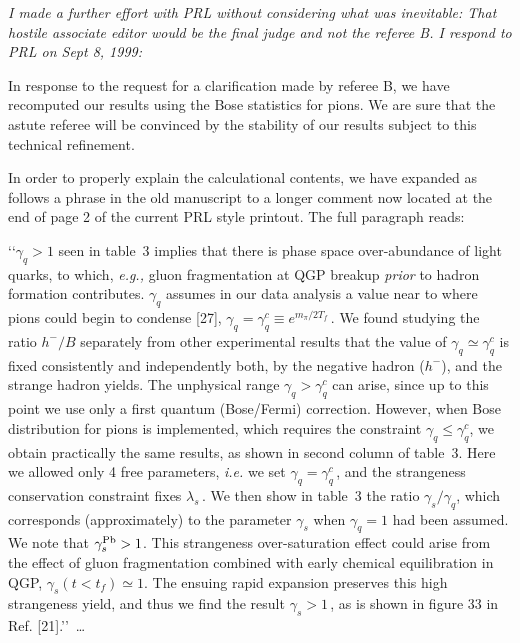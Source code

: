 \noindent \textit{I made a further effort with PRL without considering what was inevitable: That hostile  associate editor   would be the final judge and not the referee B. I respond to PRL on Sept 8, 1999:}\\[-0.7cm]
%
\begin{mdframed}[linecolor=gray,roundcorner=12pt,backgroundcolor=Dandelion!15,linewidth=1pt,leftmargin=0cm,rightmargin=0cm,topline=true,bottomline=true,skipabove=12pt]\relax%
%
In response to the request for a clarification made by referee B, we have recomputed our results using the Bose statistics for pions. We are sure that the astute referee will be convinced by the stability of our results subject to this technical refinement.

In order to properly explain the calculational contents, we have expanded as follows a phrase in the old manuscript to a longer comment now located at the end of page 2 of the current PRL style printout. The full paragraph reads:

\lq\lq $\gamma_q>1$ seen in table~3 implies that there is phase space over-abundance of light quarks, to which, {\it e.g.,} gluon fragmentation at QGP breakup {\it prior} to hadron formation contributes. $\gamma_q$ assumes in our data analysis a value near to where pions could begin to condense [27], $\gamma_q=\gamma_q^c\equiv e^{m_\pi/2T_f}$\,. We found studying the ratio $h^-/B$ separately from other experimental results that the value of $\gamma_q\simeq\gamma_q^c$ is fixed consistently and independently both, by the negative hadron ($h^-$), and the strange hadron yields. The unphysical range $\gamma_q>\gamma_q^c$ can arise, since up to this point we use only a first quantum (Bose/Fermi) correction. However, when Bose distribution for pions is implemented, which requires the constraint $\gamma_q\le\gamma_q^c$, we obtain practically the same results, as shown in second column of table~3. Here we allowed only 4 free parameters, {\it i.e.} we set $\gamma_q=\gamma_q^c$\,, and the strangeness conservation constraint fixes $\lambda_s$\,. We then show in table~3 the ratio $\gamma_s/\gamma_q$, which corresponds (approximately) to the parameter $\gamma_s$ when $\gamma_q=1$ had been assumed. We note that $\gamma_s^{\rm Pb}>1$. This strangeness over-saturation effect could arise from the effect of gluon fragmentation combined with early chemical equilibration in QGP, $\gamma_s(t<t_f)\simeq 1$. The ensuing rapid expansion preserves this high strangeness yield, and thus we find the result $\gamma_s>1$\,, as is shown in figure 33 in Ref. [21].\rq\rq\ \ldots 
 

\end{mdframed}
